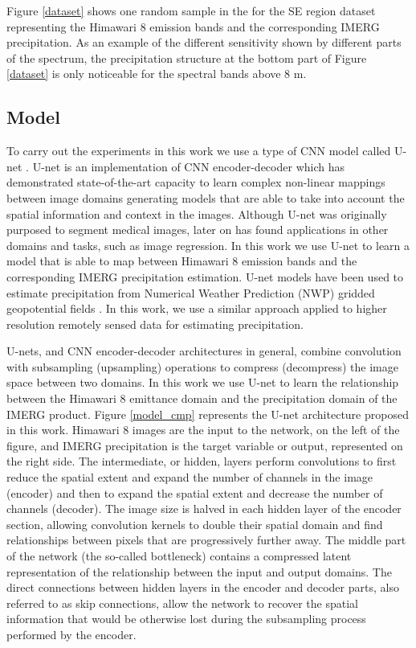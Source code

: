 \documentclass[3p,times]{elsarticle}
\begin{document}
Figure \ref{dataset} shows one random sample in the for the SE region dataset representing the Himawari 8 emission bands and the corresponding IMERG precipitation. As an example of the different sensitivity shown by different parts of the spectrum, the precipitation structure at the bottom part of Figure \ref{dataset} is only noticeable for the spectral bands above 8 \textmu m. 

\subsection{Model}

To carry out the experiments in this work we use a type of CNN model called U-net \citep{ronneberger2015u}. U-net is an implementation of CNN encoder-decoder which has demonstrated state-of-the-art capacity to learn complex non-linear mappings between image domains generating models that are able to take into account the spatial information and context in the images. Although U-net was originally purposed to segment medical images, later on has found applications in other domains and tasks, such as image regression. In this work we use U-net to learn a model that is able to map between Himawari 8 emission bands and the corresponding IMERG precipitation estimation. U-net models have been used to estimate precipitation from Numerical Weather Prediction (NWP) gridded geopotential fields \citep{larraondo2019data}. In this work, we use a similar approach applied to higher resolution remotely sensed data for estimating precipitation.

U-nets, and CNN encoder-decoder architectures in general, combine convolution with subsampling (upsampling) operations to compress (decompress) the image space between two domains. In this work we use U-net to learn the relationship between the Himawari 8 emittance domain and the precipitation domain of the IMERG product. Figure \ref{model_cmp} represents the U-net architecture proposed in this work. Himawari 8 images are the input to the network, on the left of the figure, and IMERG precipitation is the target variable or output, represented on the right side. The intermediate, or hidden, layers perform convolutions to first reduce the spatial extent and expand the number of channels in the image (encoder) and then to expand the spatial extent and decrease the number of channels (decoder). The image size is halved in each hidden layer of the encoder section, allowing convolution kernels to double their spatial domain and find relationships between pixels that are progressively further away. The middle part of the network (the so-called bottleneck) contains a compressed latent representation of the relationship between the input and output domains. The direct connections between hidden layers in the encoder and decoder parts, also referred to as skip connections, allow the network to recover the spatial information that would be otherwise lost during the subsampling process performed by the encoder.
\end{document}
